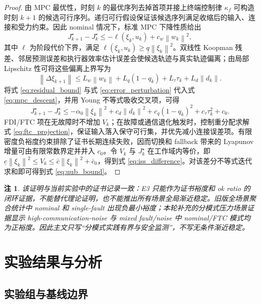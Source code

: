 \documentclass[twocolumn,3p,times,procedia]{elsarticle}
\newcommand{\norm}[1]{\left\lVert #1 \right\rVert}
\newtheorem{remark}{注}
\begin{document}
\begin{proof}
由 MPC 最优性，时刻 $k$ 的最优序列去掉首项并接上终端控制律 $\kappa_f$ 可构造时刻 $k+1$ 的候选可行序列。递归可行假设保证该候选序列满足收缩后的输入、连接和受力约束。因此 nominal 情况下，标准 MPC 下降性质给出
\begin{equation}
J_{k+1}^\star-J_k^\star\le -\ell(\xi_k,u_k)+c_w\norm{w_k}^2 ,
\label{eq:mpc_descent}
\end{equation}
其中 $\ell$ 为阶段代价下界，满足 $\ell(\xi_k,u_k)\ge \underline q\norm{\xi_k}^2$。双线性 Koopman 残差、邻居预测误差和执行器效率估计误差会使候选轨迹与真实轨迹偏离；由局部 Lipschitz 性可将这些偏离上界写为
\begin{equation}
\norm{\Delta \xi_{k+1}}\le L_w\norm{w_k}+L_q(1-q_k)+L_\tau\tau_k+L_d\norm{d_k}.
\label{eq:error_perturbation}
\end{equation}
将式 \eqref{eq:residual_bound} 与式 \eqref{eq:error_perturbation} 代入式 \eqref{eq:mpc_descent}，并用 Young 不等式吸收交叉项，可得
\begin{equation}
J_{k+1}^\star-J_k^\star\le -\alpha_0\norm{\xi_k}^2+c_d\norm{d_k}^2+c_q(1-q_k)^2+c_\tau\tau_k^2+c_0 .
\label{eq:descent_with_disturbance}
\end{equation}
FDI/FTC 项在无故障时不增加 $V_k$；在故障或通信退化触发时，控制重分配求解式 \eqref{eq:ftc_projection}，保证输入落入保守可行集，并优先减小连接误差项。有限密度负裕度约束排除了证书长期连续失败，因而切换和 fallback 带来的 Lyapunov 增量可由有限常数界定并并入 $c_0$。令 $V_k$ 与 $J_k^\star$ 在工作域内等价，即 $\underline c\norm{\xi_k}^2\le V_k\le \bar c\norm{\xi_k}^2+\bar c_0$，得到式 \eqref{eq:iss_difference}。对该差分不等式迭代求和即可得到式 \eqref{eq:uub_bound}。
\end{proof}

\begin{remark}
该证明与当前实验中的证书记录一致：E3 只能作为证书裕度和 ok ratio 的闭环证据，不能替代理论证明，也不能推出所有场景全局渐近稳定。旧版全场景聚合统计中 nominal 和 single-fault 出现负最小裕度；本轮补充的分模式压力场景证据显示 high-communication-noise 与 mixed fault/noise 中 nominal/FTC 模式均为正裕度。因此主文只写“分模式实践有界与安全监测”，不写无条件渐近稳定。
\end{remark}

\section{实验结果与分析}

\subsection{实验组与基线边界}
\end{document}
